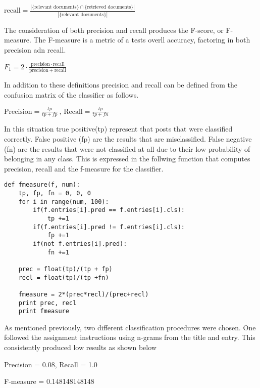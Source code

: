 \begin{center}
\Large
$   \text{recall}=\frac{|\{\text{relevant documents}\}\cap\{\text{retrieved documents}\}|}{|\{\text{relevant documents}\}|}    $
\end{center}


The consideration of both precision and recall produces the F-score, or F-measure. The F-measure is a metric of a tests overll accuracy, factoring in both precision adn recall. 

\begin{center}
\Large
$  F_1 = 2 \cdot \frac{\mathrm{precision} \cdot \mathrm{recall}}{\mathrm{precision} + \mathrm{recall}}  $
\end{center}

In addition to these definitions precision and recall can be defined from the confusion matrix of the classifier as follows. 

\begin{center}
\Large
$ \text{Precision}=\frac{tp}{tp+fp} \ \text{, }   \text{Recall}=\frac{tp}{tp+fn}  $
\end{center}



In this situation true positive(tp) represent that posts that were classified correctly. False positive (fp) are the results that are misclassified. False negative (fn) are the results that were not classified at all due to their low probability of belonging in any class. This is expressed in the follwing function that computes precision, recall and the f-measure for the classifier. 


\begin{lstlisting}[caption=Python implementation of F-measure]
def fmeasure(f, num):
	tp, fp, fn = 0, 0, 0
	for i in range(num, 100):
		if(f.entries[i].pred == f.entries[i].cls):
			tp +=1
		if(f.entries[i].pred != f.entries[i].cls):
			fp +=1
		if(not f.entries[i].pred):
			fn +=1

	prec = float(tp)/(tp + fp)
	recl = float(tp)/(tp +fn)

	fmeasure = 2*(prec*recl)/(prec+recl)
	print prec, recl
	print fmeasure
\end{lstlisting}


As mentioned previously, two different classification procedures were chosen. One followed the assignment instructions using n-grams from the title and entry. This consistently produced low results as shown below

\begin{center}
Precision = 0.08, Recall = 1.0

F-measure = 0.148148148148
\end{center}

